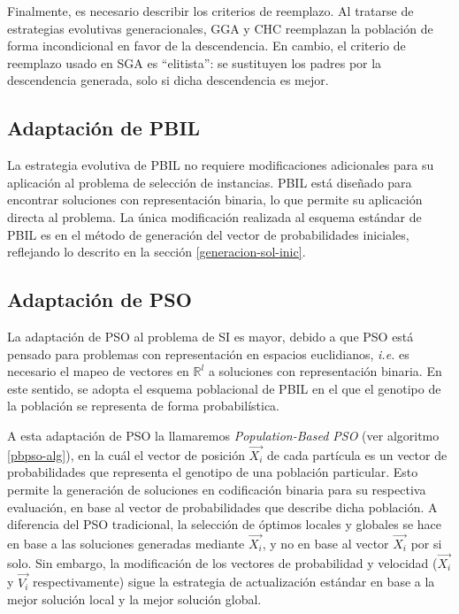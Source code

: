 Finalmente, es necesario describir los criterios de reemplazo. Al tratarse de estrategias evolutivas generacionales, GGA y CHC reemplazan la población de forma incondicional en favor de la descendencia. En cambio, el criterio de reemplazo usado en SGA es ``elitista'': se sustituyen los padres por la descendencia generada, solo si dicha descendencia es mejor.

\subsection{Adaptación de PBIL}

La estrategia evolutiva de PBIL no requiere modificaciones adicionales para su aplicación al problema de selección de instancias. PBIL está diseñado para encontrar soluciones con representación binaria, lo que permite su aplicación directa al problema. La única modificación realizada al esquema estándar de PBIL es en el método de generación del vector de probabilidades iniciales, reflejando lo descrito en la sección \ref{generacion-sol-inic}.

\subsection{Adaptación de PSO}

La adaptación de PSO al problema de SI es mayor, debido a que PSO está pensado para problemas con representación en espacios euclidianos, \emph{i.e.} es necesario el mapeo de vectores en $\mathbb{R}^l$ a soluciones con representación binaria. En este sentido, se adopta el esquema poblacional de PBIL en el que el genotipo de la población se representa de forma probabilística.

A esta adaptación de PSO la llamaremos \emph{Population-Based PSO} (ver algoritmo \ref{pbpso-alg}), en la cuál el vector de posición $\vec{X_i}$ de cada partícula es un vector de probabilidades que representa el genotipo de una población particular. Esto permite la generación de soluciones en codificación binaria para su respectiva evaluación, en base al vector de probabilidades que describe dicha población. A diferencia del PSO tradicional, la selección de óptimos locales y globales se hace en base a las soluciones generadas mediante $\vec{X_i}$, y no en base al vector $\vec{X_i}$ por si solo. Sin embargo, la modificación de los vectores de probabilidad y velocidad ($\vec{X_i}$ y $\vec{V_i}$ respectivamente) sigue la estrategia de actualización estándar en base a la mejor solución local y la mejor solución global.

